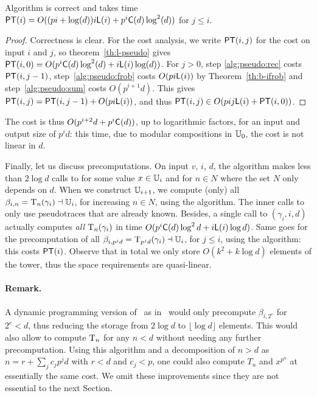 \begin{theorem}
  \label{th:b-pseudo}
  Algorithm  is correct and takes time
  $\mathrm{\sf PT}(i)=O((pi+\log (d))i\mathsf{L}(i)+p^i\mathrm{\sf C}(d)\log^2 (d))$ for $j \le
  i$.
\end{theorem}
\begin{proof} Correctness is clear. For the cost analysis, we write
$\mathrm{\sf PT}(i,j)$ for the cost on input $i$ and $j$, so
theorem~\ref{th:l-pseudo} gives $\mathrm{\sf PT}(i,0)=O(p^i\mathrm{\sf C}(d)\log^2 (d) +
i \mathsf{L}(i)\log (d))$. For $j>0$, step \ref{alg:pseudo:rec} costs
$\mathrm{\sf PT}(i,j-1)$, step~\ref{alg:pseudo:frob} costs $O(p i \mathsf{L}(i))$ by
Theorem~\ref{th:b-ifrob} and step~\ref{alg:pseudo:sum} costs
$O(p^{i+1}d)$. This gives $\mathrm{\sf PT}(i,j) = \mathrm{\sf PT}(i,j-1) +O(p i \mathsf{L}(i))$, and
thus $\mathrm{\sf PT}(i,j) \in O(pij{\sf L}(i) + \mathrm{\sf PT}(i,0))$. \end{proof}

\smallskip

The cost is thus $O(p^{i+2}d+p^i\mathrm{\sf C}(d))$, up to logarithmic
factors, for an input and output size of $p^id$: this time, due to
modular compositions in $\mathbb{U}_0$, the cost is not linear in $d$.

\smallskip

Finally, let us discuss precomputations. On input $v$, $i$, $d$, the
algorithm  makes less than $2\log d$ calls to
 for some value $x\in\mathbb{U}_i$ and for
$n\in N$ where the set $N$ only depends on $d$. When we construct
$\mathbb{U}_{i+1}$, we compute (only) all $\beta_{i,n}=\operatorname{T}_{n}(\gamma_i)
\dashv\mathbb{U}_i$, for increasing $n\in N$, using the 
algorithm. The inner calls to  only use
pseudotraces that are already known. Besides, a single call to
$(\gamma_i,i,d)$ actually computes {\em all}
$\operatorname{T}_{n}(\gamma_i)$ in time $O(p^i\mathrm{\sf C}(d)\log^2 d + i \mathsf{L}(i)\log
d)$. Same goes for the precomputation of all
$\beta_{i,p^jd}=\operatorname{T}_{p^jd}(\gamma_i) \dashv\mathbb{U}_i$, for $j\le i$, using
the  algorithm: this costs $\mathrm{\sf PT}(i)$. Observe that in
total we only store $O(k^2 + k\log d)$ elements of the tower, thus the
space requirements are quasi-linear.

\paragraph*{\bf Remark.}  A dynamic programming version
of~ as in~\cite[Algorithm~5.2]{vzGS92} would
only precompute $\beta_{i,2^e}$ for $2^e<d$, thus reducing the storage
from $2\log d$ to $\lfloor\log d\rfloor$ elements. This would also
allow to compute $\operatorname{T}_n$ for any $n<d$ without needing any further
precomputation. Using this algorithm and a decomposition of $n>d$ as
$n=r+\sum_jc_jp^jd$ with $r<d$ and $c_j<p$, one could also compute
$T_{n}$ and $x^{p^n}$ at essentially the same cost. We omit these
improvements since they are not essential to the next Section.


%
